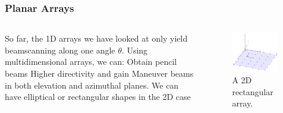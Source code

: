 \documentclass[10pt]{beamer}
\begin{document}
\begin{frame}
        \frametitle{Planar Arrays}
        \begin{columns}[T]
            \begin{column}{.4\textwidth}
                \begin{outline}
                    \1 So far, the 1D arrays we have looked at only yield beamscanning along one angle $\theta$.
                    \1 Using multidimensional arrays, we can:
                    \2 Obtain pencil beams
                    \2 Higher directivity and gain
                    \2 Maneuver beams in both elevation and azimuthal planes.
                    \1 We can have elliptical or rectangular shapes in the 2D case
                \end{outline}
            \end{column}
            \begin{column}{.6\textwidth}
                \begin{figure}[h!]
                    \centering
                    \includegraphics[width=0.95\textwidth]{planar_array.pdf}
                    \caption{A 2D rectangular array.}
                \end{figure}
            \end{column}
        \end{columns}
\end{frame}
\end{document}
